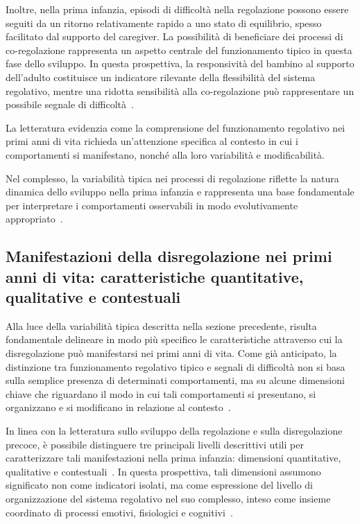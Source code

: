             Inoltre, nella prima infanzia, episodi di difficoltà nella regolazione possono essere seguiti da un ritorno relativamente rapido a uno stato di equilibrio, spesso facilitato dal supporto del caregiver. La possibilità di beneficiare dei processi di co-regolazione rappresenta un aspetto centrale del funzionamento tipico in questa fase dello sviluppo. In questa prospettiva, la responsività del bambino al supporto dell'adulto costituisce un indicatore rilevante della flessibilità del sistema regolativo, mentre una ridotta sensibilità alla co-regolazione può rappresentare un possibile segnale di difficoltà~\cite{calkins2007,tronick2007}.

            La letteratura evidenzia come la comprensione del funzionamento regolativo nei primi anni di vita richieda un'attenzione specifica al contesto in cui i comportamenti si manifestano, nonché alla loro variabilità e modificabilità.

            Nel complesso, la variabilità tipica nei processi di regolazione riflette la natura dinamica dello sviluppo nella prima infanzia e rappresenta una base fondamentale per interpretare i comportamenti osservabili in modo evolutivamente appropriato~\cite{calkins2007,kochanska2001}.

        \subsection{Manifestazioni della disregolazione nei primi anni di vita: caratteristiche quantitative, qualitative e contestuali}
        \label{sec:2_1_2}

            Alla luce della variabilità tipica descritta nella sezione precedente, risulta fondamentale delineare in modo più specifico le caratteristiche attraverso cui la disregolazione può manifestarsi nei primi anni di vita. Come già anticipato, la distinzione tra funzionamento regolativo tipico e segnali di difficoltà non si basa sulla semplice presenza di determinati comportamenti, ma su alcune dimensioni chiave che riguardano il modo in cui tali comportamenti si presentano, si organizzano e si modificano in relazione al contesto~\cite{morris2007,tronick2011}.

            In linea con la letteratura sullo sviluppo della regolazione e sulla disregolazione precoce, è possibile distinguere tre principali livelli descrittivi utili per caratterizzare tali manifestazioni nella prima infanzia: dimensioni quantitative, qualitative e contestuali~\cite{calkins2007,eisenberg2010}. In questa prospettiva, tali dimensioni assumono significato non come indicatori isolati, ma come espressione del livello di organizzazione del sistema regolativo nel suo complesso, inteso come insieme coordinato di processi emotivi, fisiologici e cognitivi~\cite{beauchaine2019,beauchaine2015}.

